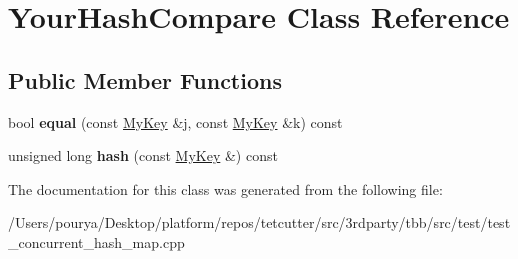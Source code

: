 \hypertarget{classYourHashCompare}{}\section{Your\+Hash\+Compare Class Reference}
\label{classYourHashCompare}
\subsection*{Public Member Functions}
\begin{DoxyCompactItemize}
\item 
\hypertarget{classYourHashCompare_aa88aa1d5702c8c51a19d3df7ea2b23dd}{}bool {\bfseries equal} (const \hyperlink{classMyKey}{My\+Key} \&j, const \hyperlink{classMyKey}{My\+Key} \&k) const \label{classYourHashCompare_aa88aa1d5702c8c51a19d3df7ea2b23dd}

\item 
\hypertarget{classYourHashCompare_acb9a45ecd08c475a76b407f408e43461}{}unsigned long {\bfseries hash} (const \hyperlink{classMyKey}{My\+Key} \&) const \label{classYourHashCompare_acb9a45ecd08c475a76b407f408e43461}

\end{DoxyCompactItemize}


The documentation for this class was generated from the following file\+:\begin{DoxyCompactItemize}
\item 
/\+Users/pourya/\+Desktop/platform/repos/tetcutter/src/3rdparty/tbb/src/test/test\+\_\+concurrent\+\_\+hash\+\_\+map.\+cpp\end{DoxyCompactItemize}

